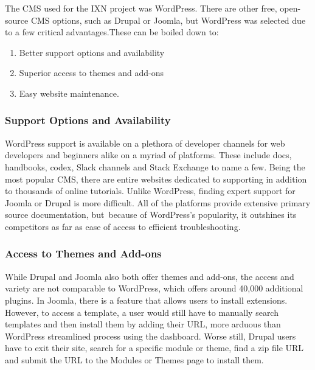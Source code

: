 \documentclass[fontsize=11pt]{extarticle}
\numberwithin{figure}{section} %
\providecommand{\tightlist}{%
  \setlength{\itemsep}{0pt}\setlength{\parskip}{0pt}}
\begin{document}
The CMS used for the IXN project was WordPress. There are other free,
open-source CMS options, such as Drupal or Joomla, but WordPress was
selected due to a few critical advantages.These can be boiled down to:

\begin{enumerate}

\tightlist
\item
  Better support options and availability
\item
  Superior access to themes and add-ons
\item
  Easy website maintenance.
\end{enumerate}

\hypertarget{support-options-and-availability}{%
\subsubsection{Support Options and
Availability~}\label{support-options-and-availability}}

WordPress support is available on a plethora of developer channels for
web developers and beginners alike on a myriad of platforms. These
include docs, handbooks, codex, Slack channels and Stack Exchange to
name a few. Being the most popular CMS, there are entire websites
dedicated to supporting in addition to thousands of online tutorials.
Unlike WordPress, finding expert support for Joomla or Drupal is more
difficult. All of the platforms provide extensive primary source
documentation, but~because of WordPress's popularity, it outshines its
competitors as far as ease of access to efficient troubleshooting.~

\hypertarget{access-to-themes-and-add-ons}{%
\subsubsection{Access to Themes and
Add-ons~}\label{access-to-themes-and-add-ons}}

While Drupal and Joomla also both offer themes and add-ons, the access
and variety are not comparable to WordPress, which offers around 40,000
additional plugins. In Joomla, there is a feature that allows users to
install extensions. However, to access a template, a user would still
have to manually search templates and then install them by adding their
URL, more arduous than WordPress streamlined process using the
dashboard. Worse still, Drupal users have to exit their site, search for
a specific module or theme, find a zip file URL and submit the URL to
the Modules or Themes page to install them.~
\end{document}
